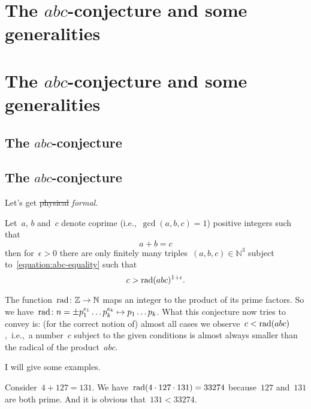 \iftex
\section{The \texorpdfstring{$abc$}{abc}-conjecture and some generalities}
\label{section:abc}
\fi
\ifblog
\section{The $abc$-conjecture and some generalities}
\label{section:abc}
\fi

\iftex
\subsection{The \texorpdfstring{$abc$}{abc}-conjecture}
\fi
\ifblog
\subsection{The $abc$-conjecture}
\fi

Let's get \sout{physical} \emph{formal}.

\begin{conjecture}
  \label{conjecture:abc}
  Let~$a$, $b$ and~$c$ denote coprime (i.e.,~$\gcd(a,b,c)=1$) positive integers such that
  \begin{equation}
    \label{equation:abc-equality}
    a+b=c
  \end{equation}
  then for~$\epsilon>0$ there are only finitely many triples~$(a,b,c)\in\mathbb{N}^3$ subject to~\eqref{equation:abc-equality} such that
  \begin{equation}
    \label{equation:abc-inequality}
    c>\operatorname{rad}(abc)^{1+\epsilon}.
  \end{equation}
\end{conjecture}

The function~$\operatorname{rad}\colon\mathbb{Z}\to\mathbb{N}$ maps an integer to the product of its prime factors. So we have~$\operatorname{rad}\colon n=\pm p_1^{e_1}\ldots p_k^{e_k}\mapsto p_1\ldots p_k$. What this conjecture now tries to convey is: (for the correct notion of) almost all cases we observe~$c<\operatorname{rad}(abc)$,~i.e.,~a number~$c$ subject to the given conditions is almost always smaller than the radical of the product~$abc$.

I will give some examples.

\begin{example}
  \label{example:abc-1}
  Consider~$4+127=131$. We have~$\operatorname{rad}(4\cdot 127\cdot 131)=33274$ because~$127$ and~$131$ are both prime. And it is obvious that~$131<33274$.
\end{example}

